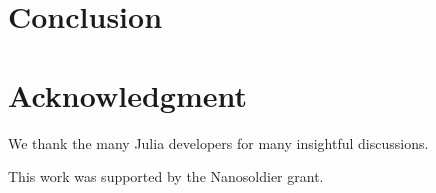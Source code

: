 \documentclass[conference]{IEEEtran}
\begin{document}
\section{Conclusion}


\section*{Acknowledgment}

We thank the many Julia developers for many insightful discussions.

This work was supported by the Nanosoldier grant.




\end{document}

